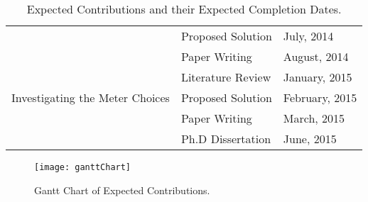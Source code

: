 \begin{table}[!h]
\begin{tabular}{|c|l|l|}
 &  Proposed Solution & July, 2014 \\ \cline{2-3}
 &  Paper Writing & August, 2014 \\ \hline
\multirow{3}{4cm}{Investigating the Meter Choices} & Literature Review & January, 2015 \\ \cline{2-3}
 &  Proposed Solution & February, 2015 \\ \cline{2-3}
 &  Paper Writing & March, 2015 \\ \hline
 &  Ph.D Dissertation & June, 2015 \\ \hline
\end{tabular}
\caption{Expected Contributions and their Expected Completion Dates.}
\label{tbl:contributions}
\end{table}

\makeatletter
\setlength{\@fptop}{0pt}
\makeatother
\begin{figure}[!t]
    \centering
    \hspace*{-1.25in}
    \texttt{[image: ganttChart]}
    \caption{Gantt Chart of Expected Contributions.}
    \label{fig:ganttChart}
\end{figure}

